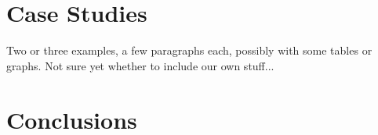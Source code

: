 \documentclass{article}
\begin{document}
\section*{Case Studies}
Two or three examples, a few paragraphs each, possibly with some tables or graphs. Not sure yet whether to include our own stuff...

\section*{Conclusions}

\printbibliography

\end{document}
